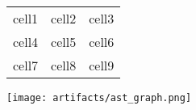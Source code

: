 \documentclass{article}
\begin{document}
\begin{tabular}{ |c|c|c| }
\hline
cell1 & cell2 & cell3\\
cell4 & cell5 & cell6\\
cell7 & cell8 & cell9\\
\hline
\end{tabular}
\texttt{[image: artifacts/ast\_graph.png]}
\end{document}
